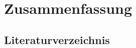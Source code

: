 \documentclass[a4paper,12pt]{report}
\begin{document}


\newpage

\chapter*{Zusammenfassung}

\lipsum[1]

\newpage

\tableofcontents

\newpage

\pagestyle{fancy}
\fancyfoot{}
\fancyhead{}
\fancyhead[L]{\rightmark} %
\renewcommand{\headruleskip}{2mm} %
\fancyfoot[C]{\thepage} %
\renewcommand{\headrulewidth}{0.5pt} %
\renewcommand{\footrulewidth}{1.5pt} %
\addtolength{\headheight}{\baselineskip} %
\renewcommand{\sectionmark}[1]{\markboth{#1}{}} %
\renewcommand{\subsectionmark}[1]{\markright{#1}} %
\fancyhead[R]{\leftmark} %


\setcounter{page}{1}



\newpage



\newpage



\newpage



\newpage



\newpage



\newpage

\section{Literaturverzeichnis}
\printbibliography[heading=none]
\end{document}
